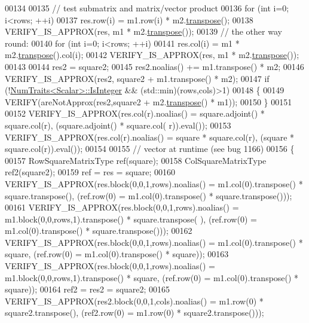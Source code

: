 \begin{DoxyCode}
00134 
00135   \textcolor{comment}{// test submatrix and matrix/vector product}
00136   \textcolor{keywordflow}{for} (\textcolor{keywordtype}{int} i=0; i<rows; ++i)
00137     res.row(i) = m1.row(i) * m2.\hyperlink{group___core___module_ac8952c19644a4ac7e41bea45c19b909c}{transpose}();
00138   VERIFY\_IS\_APPROX(res, m1 * m2.\hyperlink{group___core___module_ac8952c19644a4ac7e41bea45c19b909c}{transpose}());
00139   \textcolor{comment}{// the other way round:}
00140   \textcolor{keywordflow}{for} (\textcolor{keywordtype}{int} i=0; i<rows; ++i)
00141     res.col(i) = m1 * m2.\hyperlink{group___core___module_ac8952c19644a4ac7e41bea45c19b909c}{transpose}().col(i);
00142   VERIFY\_IS\_APPROX(res, m1 * m2.\hyperlink{group___core___module_ac8952c19644a4ac7e41bea45c19b909c}{transpose}());
00143 
00144   res2 = square2;
00145   res2.noalias() += m1.transpose() * m2;
00146   VERIFY\_IS\_APPROX(res2, square2 + m1.transpose() * m2);
00147   \textcolor{keywordflow}{if} (!\hyperlink{group___core___module_struct_eigen_1_1_num_traits}{NumTraits<Scalar>::IsInteger} && (std::min)(rows,cols)>1)
00148   \{
00149     VERIFY(areNotApprox(res2,square2 + m2.\hyperlink{group___core___module_ac8952c19644a4ac7e41bea45c19b909c}{transpose}() * m1));
00150   \}
00151 
00152   VERIFY\_IS\_APPROX(res.col(r).noalias() = square.adjoint() * square.col(r), (square.adjoint() * square.col(
      r)).eval());
00153   VERIFY\_IS\_APPROX(res.col(r).noalias() = square * square.col(r), (square * square.col(r)).eval());
00154 
00155   \textcolor{comment}{// vector at runtime (see bug 1166)}
00156   \{
00157     RowSquareMatrixType ref(square);
00158     ColSquareMatrixType ref2(square2);
00159     ref = res = square;
00160     VERIFY\_IS\_APPROX(res.block(0,0,1,rows).noalias() = m1.col(0).transpose() * square.transpose(),         
         (ref.row(0) = m1.col(0).transpose() * square.transpose()));
00161     VERIFY\_IS\_APPROX(res.block(0,0,1,rows).noalias() = m1.block(0,0,rows,1).transpose() * square.transpose(
      ), (ref.row(0) = m1.col(0).transpose() * square.transpose()));
00162     VERIFY\_IS\_APPROX(res.block(0,0,1,rows).noalias() = m1.col(0).transpose() * square,                     
         (ref.row(0) = m1.col(0).transpose() * square));
00163     VERIFY\_IS\_APPROX(res.block(0,0,1,rows).noalias() = m1.block(0,0,rows,1).transpose() * square,          
         (ref.row(0) = m1.col(0).transpose() * square));
00164     ref2 = res2 = square2;
00165     VERIFY\_IS\_APPROX(res2.block(0,0,1,cols).noalias() = m1.row(0) * square2.transpose(),                   
         (ref2.row(0) = m1.row(0) * square2.transpose()));

\end{DoxyCode}
